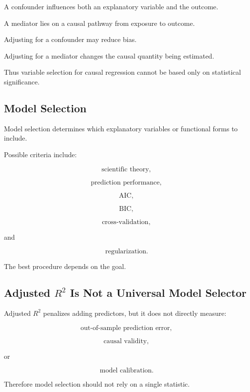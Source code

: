A confounder influences both an explanatory variable and the outcome.

A mediator lies on a causal pathway from exposure to outcome.

Adjusting for a confounder may reduce bias.

Adjusting for a mediator changes the causal quantity being estimated.

Thus variable selection for causal regression cannot be based only on
statistical significance.

\subsection{Model Selection}
\label{subsec:regression-model-selection}

Model selection determines which explanatory variables or functional
forms to include.

Possible criteria include:

\[
\boxed{
\text{scientific theory},
}
\]

\[
\boxed{
\text{prediction performance},
}
\]

\[
\boxed{
\text{AIC},
}
\]

\[
\boxed{
\text{BIC},
}
\]

\[
\boxed{
\text{cross-validation},
}
\]

and

\[
\boxed{
\text{regularization}.
}
\]

The best procedure depends on the goal.

\subsection{Adjusted \(R^2\) Is Not a Universal Model Selector}
\label{subsec:adjusted-r2-not-universal}

Adjusted \(R^2\) penalizes adding predictors, but it does not directly
measure:

\[
\boxed{
\text{out-of-sample prediction error},
}
\]

\[
\boxed{
\text{causal validity},
}
\]

or

\[
\boxed{
\text{model calibration}.
}
\]

Therefore model selection should not rely on a single statistic.

